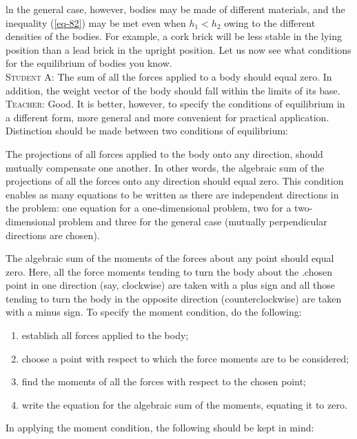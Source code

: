 \documentclass[a4paper,sfsidenotes]{tufte-book}
\begin{document}
ln the general
case, however, bodies may be made of different materials, and the inequality  (\ref{eq-82}) may be met even when $h_{1}<h_{2}$ owing to the different densities of the bodies. For example, a cork brick will be less stable in the lying position than a lead brick in the upright position. Let us now see what conditions for the equilibrium of bodies you know.
\\
\textsc{Student A:} The sum of all the forces applied to a body should equal zero. In addition, the weight vector of the body should fall within the limits of its base.
\\
\textsc{Teacher:} Good. It is better, however, to specify the conditions of equilibrium in a different form, more general and more convenient for practical application. Distinction should be made between two conditions of equilibrium:

\begin{description}[leftmargin=1cm]
\item[First condition:] The projections of all forces applied to the body onto any direction, should mutually compensate one another. In other words, the algebraic sum of the projections of all the forces onto any direction should equal zero. This condition enables as many equations to be written as there
are independent directions in the problem: one equation for a one-dimensional problem, two for a two-dimensional problem and three for the general case (mutually perpendicular directions are chosen).

\item[Second condition (moment condition):] The algebraic sum of the moments of the forces about any point should equal zero. Here, all the force moments tending to turn the body about the .chosen point in one direction (say, clockwise) are taken with a plus sign and all those tending to turn the body in the opposite direction (counterclockwise) are taken with a minus sign. To specify the moment condition, do the following:

\begin{enumerate}[label=(\alph*), leftmargin=1cm]
 \item establish all forces applied to the body; 
 \item choose a point with respect to which the force moments are to be considered;
\item find the moments of all the forces with respect to the chosen point; 
 \item write the equation for the algebraic sum of the moments, equating it to zero. 
 \end{enumerate}
\end{description}
 In applying the moment condition, the following should be kept in mind: 
\end{document}
